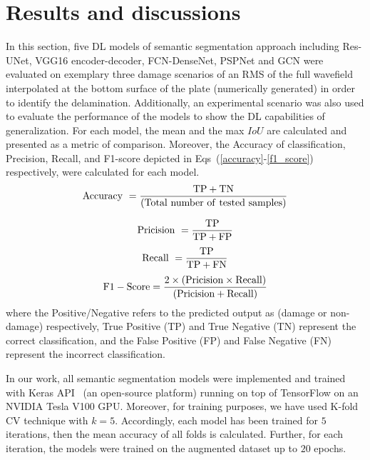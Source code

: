 \section{Results and discussions}
\label{section:results_and_discussions}
In this section, five DL models  of semantic segmentation approach including  Res-UNet, VGG16 encoder-decoder, FCN-DenseNet, PSPNet and GCN were evaluated on exemplary three damage scenarios of an RMS of the full wavefield interpolated at the bottom surface of the plate (numerically generated) in order to identify the delamination.
Additionally, an experimental scenario was also used to evaluate the performance of the models to show the DL capabilities of generalization.
For each model, the mean and the max \(IoU\) are calculated and presented as a metric of comparison.
Moreover, the Accuracy of classification, Precision, Recall, and F1-score depicted in Eqs~(\ref{accuracy}-\ref{f1_score}) respectively, were calculated for each model.
\begin{equation}
	\rm Accuracy\ = \frac{TP+TN}{(Total\ number\ of\ tested\ samples)}
	\label{accuracy}
\end{equation}

\begin{equation}
	\rm Pricision\ =\frac{TP}{TP+FP}
	\label{pricisoin}
\end{equation}
\begin{equation}
	\rm Recall\ = \frac{TP}{TP+ FN}
	\label{recall}
\end{equation}
\begin{equation}
	\rm F1-Score =\frac{2 \times (Pricision\times Recall)}{(Pricision + Recall)} 
	\label{f1_score}
\end{equation}
where the Positive/Negative refers to the predicted output as (damage or non-damage) respectively, True Positive (TP) and True Negative (TN)  represent the correct classification, and the False Positive (FP) and False Negative (FN) represent the incorrect classification.

In our work, all semantic segmentation models were implemented and trained with Keras API~\cite{chollet2015keras} (an open-source platform) running on top of TensorFlow on an NVIDIA Tesla V100 GPU. 
Moreover, for training purposes, we have used K-fold CV technique with \(k=5\). Accordingly, each model has been trained for \(5\) iterations, then the mean accuracy of all folds is calculated. 
Further, for each iteration, the models were trained on the augmented dataset up to \(20\) epochs.

